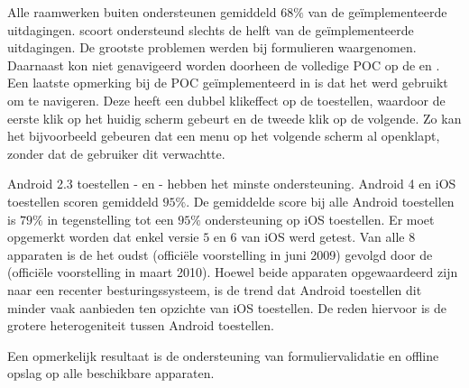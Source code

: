 Alle raamwerken buiten \lungo{} ondersteunen gemiddeld $68\%$ van de geïmplementeerde uitdagingen.
\lungo{} scoort ondersteund slechts de helft van de geïmplementeerde uitdagingen.
De grootste problemen werden bij formulieren waargenomen.
Daarnaast kon niet genavigeerd worden doorheen de volledige POC op de \htc{} en \gtab{}.
Een laatste opmerking bij de POC geïmplementeerd in \lungo{} is dat het  werd gebruikt om te navigeren.
Deze heeft een dubbel klikeffect op de toestellen, waardoor de eerste klik op het huidig scherm gebeurt en de tweede klik op de volgende.
Zo kan het bijvoorbeeld gebeuren dat een menu op het volgende scherm al openklapt, zonder dat de gebruiker dit verwachtte.

Android 2.3 toestellen - \htc{} en \gtab{} - hebben het minste ondersteuning.
Android 4 en iOS toestellen scoren gemiddeld $95\%$.
De gemiddelde score bij alle Android toestellen is $79\%$ in tegenstelling tot een $95\%$ ondersteuning op iOS toestellen.
Er moet opgemerkt worden dat enkel versie $5$ en $6$ van iOS werd getest.
Van alle $8$ apparaten is de \iphoneiii{} het oudst (officiële voorstelling in juni 2009) gevolgd door de \gs{} (officiële voorstelling in maart 2010). %
Hoewel beide apparaten opgewaardeerd zijn naar een recenter besturingssysteem, is de trend dat Android toestellen dit minder vaak aanbieden ten opzichte van iOS toestellen. %
De reden hiervoor is de grotere heterogeniteit tussen Android toestellen.


Een opmerkelijk resultaat is de ondersteuning van formuliervalidatie en offline opslag op alle beschikbare apparaten.


